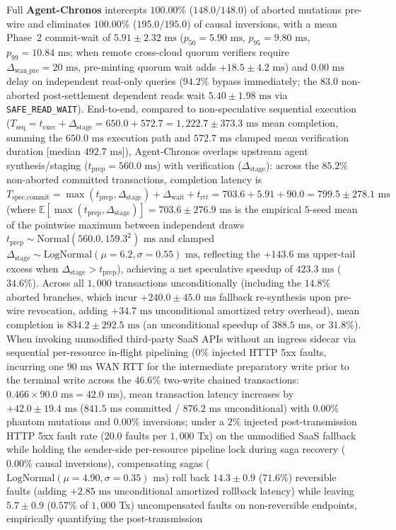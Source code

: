 \documentclass[conference,10pt]{IEEEtran}
\begin{document}
Full \textbf{Agent-Chronos} intercepts $100.00\%$ ($148.0/148.0$) of aborted mutations pre-wire and eliminates $100.00\%$ ($195.0/195.0$) of causal inversions, with a mean Phase~2 commit-wait of $5.91 \pm 2.32\text{ ms}$ ($p_{50} = 5.90\text{ ms}$, $p_{95} = 9.80\text{ ms}$, $p_{99} = 10.84\text{ ms}$; when remote cross-cloud quorum verifiers require $\Delta_{\text{wan\_pre}} = 20\text{ ms}$, pre-minting quorum wait adds $+18.5 \pm 4.2\text{ ms}$) and $0.00\text{ ms}$ delay on independent read-only queries ($94.2\%$ bypass immediately; the $83.0$ non-aborted post-settlement dependent reads wait $5.40 \pm 1.98\text{ ms}$ via \texttt{SAFE\_READ\_WAIT}). End-to-end, compared to non-speculative sequential execution ($T_{\text{seq}} = t_{\text{exec}} + \Delta_{\text{stage}} = 650.0 + 572.7 = 1{,}222.7 \pm 373.3\text{ ms}$ mean completion, summing the $650.0\text{ ms}$ execution path and $572.7\text{ ms}$ clamped mean verification duration [median $492.7\text{ ms}$]), Agent-Chronos overlaps upstream agent synthesis/staging ($t_{\text{prep}} = 560.0\text{ ms}$) with verification ($\Delta_{\text{stage}}$): across the $85.2\%$ non-aborted committed transactions, completion latency is $T_{\text{spec,commit}} = \max(t_{\text{prep}}, \Delta_{\text{stage}}) + \Delta_{\text{wait}} + t_{\text{rtt}} = 703.6 + 5.91 + 90.0 = 799.5 \pm 278.1\text{ ms}$ (where $\mathbb{E}[\max(t_{\text{prep}}, \Delta_{\text{stage}})] = 703.6 \pm 276.9\text{ ms}$ is the empirical $5$-seed mean of the pointwise maximum between independent draws $t_{\text{prep}} \sim \text{Normal}(560.0, 159.3^2)\text{ ms}$ and clamped $\Delta_{\text{stage}} \sim \text{LogNormal}(\mu=6.2,\sigma=0.55)\text{ ms}$, reflecting the $+143.6\text{ ms}$ upper-tail excess when $\Delta_{\text{stage}} > t_{\text{prep}}$), achieving a net speculative speedup of $423.3\text{ ms}$ ($34.6\%$). Across all $1{,}000$ transactions unconditionally (including the $14.8\%$ aborted branches, which incur $+240.0 \pm 45.0\text{ ms}$ fallback re-synthesis upon pre-wire revocation, adding $+34.7\text{ ms}$ unconditional amortized retry overhead), mean completion is $834.2 \pm 292.5\text{ ms}$ (an unconditional speedup of $388.5\text{ ms}$, or $31.8\%$). When invoking unmodified third-party SaaS APIs without an ingress sidecar via sequential per-resource in-flight pipelining ($0\%$ injected HTTP 5xx faults, incurring one $90\text{ ms}$ WAN RTT for the intermediate preparatory write prior to the terminal write across the $46.6\%$ two-write chained transactions: $0.466 \times 90.0\text{ ms} = 42.0\text{ ms}$), mean transaction latency increases by $+42.0 \pm 19.4\text{ ms}$ ($841.5\text{ ms}$ committed / $876.2\text{ ms}$ unconditional) with $0.00\%$ phantom mutations and $0.00\%$ inversions; under a $2\%$ injected post-transmission HTTP 5xx fault rate ($20.0$ faults per $1{,}000$ Tx) on the unmodified SaaS fallback while holding the sender-side per-resource pipeline lock during saga recovery ($0.00\%$ causal inversions), compensating sagas ($\text{LogNormal}(\mu=4.90,\sigma=0.35)\text{ ms}$) roll back $14.3 \pm 0.9$ ($71.6\%$) reversible faults (adding $+2.85\text{ ms}$ unconditional amortized rollback latency) while leaving $5.7 \pm 0.9$ ($0.57\%$ of $1{,}000$ Tx) uncompensated faults on non-reversible endpoints, empirically quantifying the post-transmission 
\end{document}
